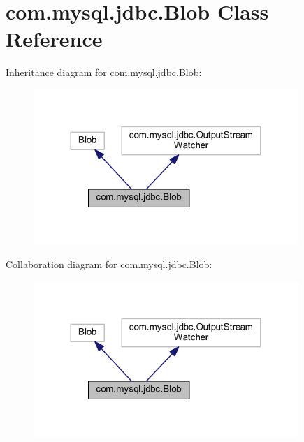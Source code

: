 \hypertarget{classcom_1_1mysql_1_1jdbc_1_1_blob}{}\section{com.\+mysql.\+jdbc.\+Blob Class Reference}
\label{classcom_1_1mysql_1_1jdbc_1_1_blob}


Inheritance diagram for com.\+mysql.\+jdbc.\+Blob\+:\nopagebreak
\begin{figure}[H]
\begin{center}
\leavevmode
\includegraphics[width=284pt]{classcom_1_1mysql_1_1jdbc_1_1_blob__inherit__graph}
\end{center}
\end{figure}


Collaboration diagram for com.\+mysql.\+jdbc.\+Blob\+:\nopagebreak
\begin{figure}[H]
\begin{center}
\leavevmode
\includegraphics[width=284pt]{classcom_1_1mysql_1_1jdbc_1_1_blob__coll__graph}
\end{center}
\end{figure}
